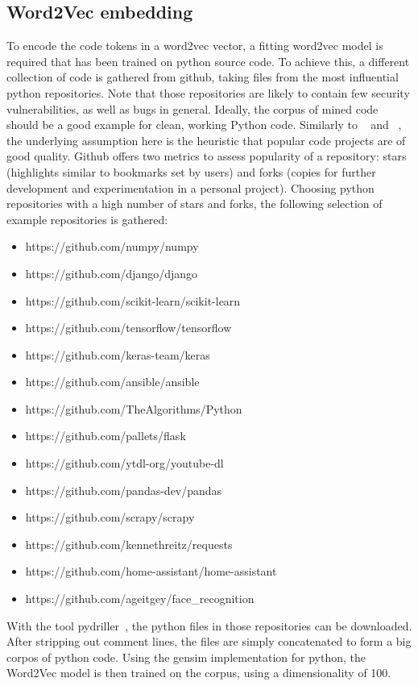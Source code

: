 \documentclass[
	a4paper,
	pagesize,
	pdftex,
	12pt,
	twoside, %
	BCOR=5mm, %
	ngerman,
	fleqn,
	final,
	]{scrartcl}
\begin{document}



\subsection{Word2Vec embedding}
To encode the code tokens in a word2vec vector, a fitting word2vec model is required that has been trained on python source code. To achieve this, a different collection of code is gathered from github, taking files from the most influential python repositories. Note that those repositories are likely to contain few security vulnerabilities, as well as bugs in general. Ideally, the corpus of mined code should be a good example for clean, working Python code. Similarly to ~\cite{Bhoopchand.2016} and ~\cite{Allamanis.2013}, the underlying assumption here is the  heuristic that popular code projects are of good quality. Github offers two metrics to assess popularity of a repository: stars (highlights similar to bookmarks set by users) and forks (copies for further development and experimentation in a personal project). Choosing python repositories with a high number of stars and forks, the following selection of example repositories is gathered:

\begin{itemize}[noitemsep]
	\item https://github.com/numpy/numpy
	\item https://github.com/django/django
	\item https://github.com/scikit-learn/scikit-learn
	\item https://github.com/tensorflow/tensorflow
	\item https://github.com/keras-team/keras
	\item https://github.com/ansible/ansible
	\item https://github.com/TheAlgorithms/Python
	\item https://github.com/pallets/flask
	\item https://github.com/ytdl-org/youtube-dl
	\item https://github.com/pandas-dev/pandas
	\item https://github.com/scrapy/scrapy
	\item https://github.com/kennethreitz/requests
	\item https://github.com/home-assistant/home-assistant
	\item https://github.com/ageitgey/face\_recognition
\end{itemize}
With the tool pydriller~\cite{Spadini.2018}, the python files in those repositories can be downloaded. After stripping out comment lines, the files are simply concatenated to form a big corpos of python code. Using the gensim implementation for python, the Word2Vec model is then trained on the corpus, using a dimensionality of 100.
\end{document}
